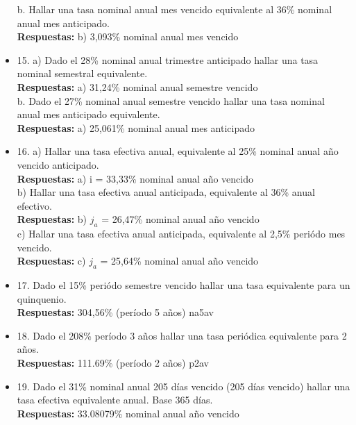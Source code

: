 \begin{itemize}
       b. Hallar una tasa nominal anual mes vencido equivalente al 36\% nominal anual mes anticipado.\\
       \textbf{Respuestas:} b) 3,093\% nominal anual mes vencido
       \medskip

 \item 15. a) Dado el 28\% nominal anual trimestre anticipado hallar una tasa nominal semestral equivalente.\\
       \textbf{Respuestas:} a) 31,24\% nominal anual semestre vencido \\

       b. Dado el 27\% nominal anual semestre vencido hallar una tasa nominal anual mes anticipado equivalente.\\
       \textbf{Respuestas:} a) 25,061\% nominal anual mes anticipado
       \medskip

 \item 16. a) Hallar una tasa efectiva anual, equivalente al 25\% nominal anual año vencido anticipado.\\
       \textbf{Respuestas:} a) i = 33,33\% nominal anual año vencido\\

       b) Hallar una tasa efectiva anual anticipada, equivalente al 36\% anual efectivo. \\
       \textbf{Respuestas:} b) $j_{a}$ = 26,47\% nominal anual año vencido\\

       c) Hallar una tasa efectiva anual anticipada, equivalente al 2,5\% periódo mes vencido.\\
       \textbf{Respuestas:} c) $j_{a}$ = 25,64\% nominal anual año vencido
       \medskip

 \item 17. Dado el 15\% periódo semestre vencido hallar una tasa equivalente para un quinquenio.\\
       \textbf{Respuestas:} 304,56\% (período 5 años) na5av
       \medskip

 \item 18. Dado el 208\% período 3 años hallar una tasa periódica equivalente para 2 años.\\
       \textbf{Respuestas:} 111.69\% (período 2 años)  p2av
       \medskip

 \item 19. Dado el 31\% nominal anual 205 días vencido (205 días vencido) hallar una tasa efectiva equivalente anual. Base 365 días.\\
       \textbf{Respuestas:} 33.08079\% nominal anual año vencido
       \medskip


\end{itemize}
